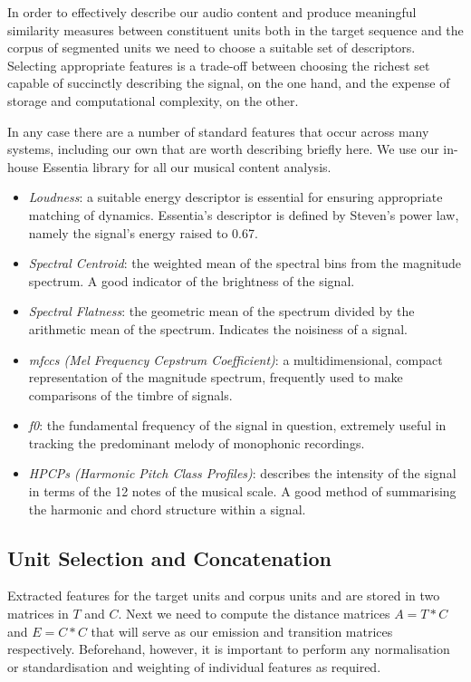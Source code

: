 {{{{{{{In order to effectively describe our audio content and produce meaningful similarity measures between constituent units both in the target sequence and the corpus of segmented units we need to choose a suitable set of descriptors. Selecting appropriate features is a trade-off between choosing the richest set capable of succinctly describing the signal, on the one hand, and the expense of storage and computational complexity, on the other. 

In any case there are a number of standard features that occur across many systems, including our own that are worth describing briefly here. We use our in-house Essentia \citep{Bogdanov2013} library for all our musical content analysis.
\begin{itemize}
  \item \textit{Loudness}: a suitable energy descriptor is essential for ensuring appropriate matching of dynamics. Essentia's descriptor is defined by Steven’s power law, namely the signal’s energy raised to 0.67.
  \item \textit{Spectral Centroid}: the weighted mean of the spectral bins from the magnitude spectrum. A good indicator of the brightness of the signal.
  \item \textit{Spectral Flatness}: the geometric mean of the spectrum divided by the arithmetic mean of the spectrum. Indicates the noisiness of a signal.
  \item \textit{\acrshort{mfcc}s (Mel Frequency Cepstrum Coefficient)}: a multidimensional, compact representation of the magnitude spectrum, frequently used to make comparisons of the timbre of signals.
  \item \textit{f0}: the fundamental frequency of the signal in question, extremely useful in tracking the predominant melody of monophonic recordings.
  \item \textit{HPCPs (Harmonic Pitch Class Profiles)}: describes the intensity of the signal in terms of the 12 notes of the musical scale. A good method of summarising the harmonic and chord structure within a signal.
\end{itemize}

\subsection{Unit Selection and Concatenation}

Extracted features for the target units and corpus units and are stored in two matrices in $T$ and $C$. Next we need to compute the distance matrices $A = T * C$  and $E = C * C$ that will serve as our emission and transition matrices respectively. Beforehand, however, it is important to perform any normalisation or standardisation and weighting of individual features as required.

}}}}}}}
